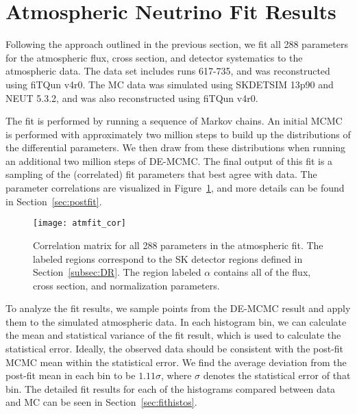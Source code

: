 

\section{Atmospheric Neutrino Fit Results}
\label{sec:fitresults}

Following the approach outlined in the previous section, we fit all 288
parameters for the atmospheric flux, cross section, and detector systematics to
the atmospheric data.  The data set includes runs 617-735, and was
reconstructed using fiTQun v4r0.  The MC data was simulated using SKDETSIM
13p90 and NEUT 5.3.2, and was also reconstructed using fiTQun v4r0.

The fit is performed by running a sequence of Markov chains.  An initial MCMC is
performed with approximately two million steps to build up the distributions of
the differential parameters.  We then draw from these distributions when running
an additional two million steps of DE-MCMC\@.  The final output of this fit is 
a sampling of the (correlated) fit parameters that best agree with data. The parameter
correlations are visualized in Figure~\ref{fig:fitcorr}, and more details can
be found in Section~\ref{sec:postfit}.

\begin{figure}[h]
  \begin{center}
    \texttt{[image: atmfit\_cor]}
  \end{center}
  \caption{Correlation matrix for all 288 parameters in the atmospheric fit.
  The labeled regions correspond to the SK detector regions defined in
  Section~\ref{subsec:DR}.  The region labeled $\alpha$ contains all of the
  flux, cross section, and normalization parameters.}
  \label{fig:fitcorr}
\end{figure}

To analyze the fit results, we
sample points from the DE-MCMC result and apply them to the simulated
atmospheric data\@.  In each histogram bin, we can calculate the mean and
statistical variance of the fit result, which is used to calculate the
statistical error.  Ideally, the observed data should be consistent with the
post-fit MCMC mean within the statistical error.  We find the average deviation
from the post-fit mean in each bin to be $1.11\sigma$, where $\sigma$ denotes
the statistical error of that bin.  The detailed fit results for each of the
histograms compared between data and MC can be seen in Section~\ref{sec:fithistos}.



